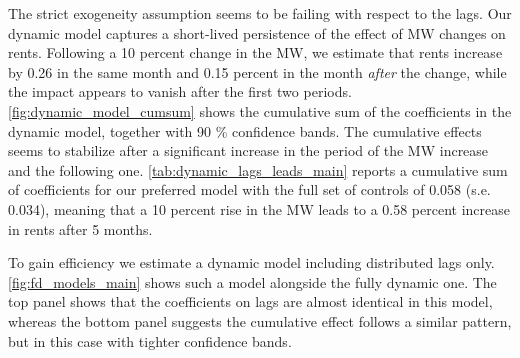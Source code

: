 The strict exogeneity assumption seems to be failing with respect to the lags. Our dynamic model 
captures a short-lived persistence of the effect of MW changes on rents. Following a 10 percent 
change in the MW, we estimate that rents increase by 0.26 in the same month and 0.15 percent in the 
month \textit{after} the change, while the impact appears to vanish after the first two periods. 
\autoref{fig:dynamic_model_cumsum} shows the cumulative sum of the coefficients in the dynamic model,
together with 90 \% confidence bands. The cumulative effects seems to stabilize after a significant 
increase in the period of the MW increase and the following one. \autoref{tab:dynamic_lags_leads_main}
reports a cumulative sum of coefficients for our preferred model with the full set of controls 
of 0.058 (s.e. 0.034), meaning that a 10 percent rise in the MW leads to a 0.58 percent increase 
in rents after 5 months.

To gain efficiency we estimate a dynamic model including distributed lags only. 
\autoref{fig:fd_models_main} shows such a model alongside the fully dynamic one. The top panel shows 
that the coefficients on lags are almost identical in this model, whereas the bottom panel suggests 
the cumulative effect follows a similar pattern, but in this case with tighter confidence bands.

